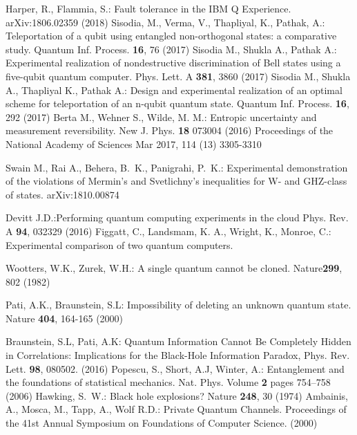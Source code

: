 \begin{thebibliography}{66}
 Harper, R., Flammia, S.: Fault tolerance in the IBM Q Experience. arXiv:1806.02359 (2018)
 Sisodia, M., Verma, V., Thapliyal, K., Pathak, A.: Teleportation of a qubit using entangled non-orthogonal states: a comparative study. Quantum Inf. Process. \textbf{16}, 76 (2017)
 Sisodia M., Shukla A., Pathak A.: Experimental realization of nondestructive discrimination of Bell states using a five-qubit quantum computer. Phys. Lett. A \textbf{381}, 3860 (2017)
 Sisodia M., Shukla A., Thapliyal K., Pathak A.: Design and experimental realization of an optimal scheme for teleportation of an n-qubit quantum state. Quantum Inf. Process. \textbf{16}, 292 (2017) 
 Berta M., Wehner S., Wilde, M. M.: Entropic uncertainty and measurement reversibility. New J. Phys. \textbf{18} 073004 (2016)
Proceedings of the National Academy of Sciences Mar 2017, 114 (13) 3305-3310

 Swain M., Rai A.,  Behera, B.~K., Panigrahi, P.~K.: Experimental demonstration of the violations of Mermin's and Svetlichny's inequalities for W- and GHZ-class of states. arXiv:1810.00874

 Devitt J.D.:Performing quantum computing experiments in the cloud
 Phys. Rev. A \textbf{94}, 032329 (2016)
 Figgatt, C., Landsmam, K. A., Wright, K., Monroe, C.: Experimental comparison of two quantum computers.

Wootters, W.K., Zurek, W.H.: A single quantum cannot be cloned. Nature\textbf{299}, 802 (1982)
 
 Pati, A.K., Braunstein, S.L: Impossibility of deleting an unknown quantum state. Nature \textbf{404}, 164-165 (2000)

 Braunstein, S.L, Pati, A.K: Quantum Information Cannot Be Completely Hidden in Correlations: Implications for the Black-Hole Information Paradox, Phys. Rev. Lett. \textbf{98}, 080502. (2016)
  Popescu, S., Short, A.J, Winter, A.: Entanglement and the foundations of statistical mechanics. Nat. Phys. Volume \textbf{2} pages 754–758 (2006)
 Hawking, S.~W.: Black hole explosions? Nature \textbf{248}, 30 (1974)
 Ambainis, A., Mosca, M., Tapp, A., Wolf R.D.: Private Quantum Channels. Proceedings of the 41st Annual Symposium on Foundations of Computer Science. (2000)


\end{thebibliography}
